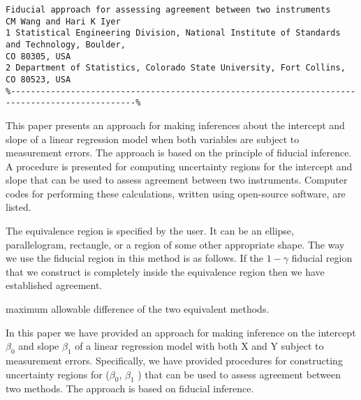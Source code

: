 \documentclass[Chap3amain.tex]{subfiles}
\begin{document}
\begin{verbatim}
Fiducial approach for assessing agreement between two instruments
CM Wang and Hari K Iyer
1 Statistical Engineering Division, National Institute of Standards and Technology, Boulder,
CO 80305, USA
2 Department of Statistics, Colorado State University, Fort Collins, CO 80523, USA
%-----------------------------------------------------------------------------------------------%
\end{verbatim}
This paper presents an approach for making inferences about the intercept and slope of a linear
regression model when both variables are subject to measurement errors. The approach is
based on the principle of fiducial inference. A procedure is presented for computing
uncertainty regions for the intercept and slope that can be used to assess agreement between
two instruments. Computer codes for performing these calculations, written using open-source
software, are listed.

The equivalence region is specified by the user. It can be an ellipse, parallelogram,
rectangle, or a region of some other appropriate shape. The way we use the fiducial region in this method is as follows. If
the $1−\gamma$ fiducial region that we construct is completely inside the equivalence region then we have established agreement.

maximum allowable difference of the two equivalent methods.

In this paper we have provided an approach for making inference on the intercept $\beta_0$ and slope $\beta_1$ of a linear regression
model with both X and Y subject to measurement errors. Specifically, we have provided procedures for constructing
uncertainty regions for ($\beta_0$, $\beta_1$ ) that can be used to assess agreement between two methods. The approach is based on
fiducial inference.


\end{document}
